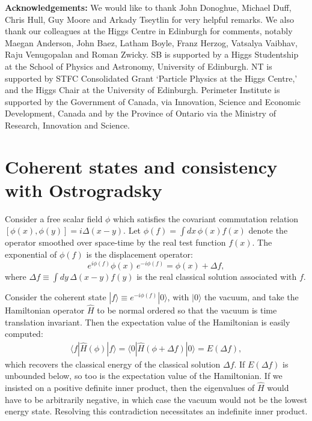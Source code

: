 \documentclass[pra,aps,amsmath,amssymb,notitlepage, twocolumn,superscriptaddress,longbibliography,nofootinbib,floatfix,10pt]{revtex4-2}
\begin{document}
{\bf Acknowledgements:} We would like to thank John Donoghue, Michael Duff, Chris Hull, Guy Moore and Arkady Tseytlin for very helpful remarks. We also thank our colleagues at the Higgs Centre in Edinburgh for comments, notably Maegan Anderson, John Baez, Latham Boyle, Franz Herzog, Vatsalya Vaibhav, Raju Venugopalan and Roman Zwicky. SB is supported by a Higgs Studentship at the School of Physics and Astronomy, University of
Edinburgh. NT is supported by STFC Consolidated Grant ‘Particle Physics at the Higgs Centre,’ and the Higgs Chair at
the University of Edinburgh. Perimeter Institute
is supported by the Government of Canada, via
Innovation, Science and Economic Development,
Canada and by the Province of Ontario via the
Ministry of Research, Innovation and Science.


%

\appendix

\section{Coherent states and consistency with Ostrogradsky}
\label{app:coherent}

Consider a free scalar field $\phi$ which satisfies the covariant commutation relation $[\phi(x),\phi(y)]=i\Delta(x-y)$. Let $\phi(f)=\int d x\,\phi(x) f(x)$ denote the operator smoothed over space-time by the real test function $f(x)$. The exponential of $\phi(f)$ is the displacement operator:
\begin{equation}
    e^{i\phi(f)}\phi(x) \, e^{-i\phi(f)}=\phi(x)+\Delta f,
\end{equation}
where $\Delta f \equiv \int dy\,\Delta(x-y)f(y)$ is the real classical solution associated with $f$. 
 
 Consider the coherent state $|f\rangle \equiv e^{-i\phi(f)}|0\rangle$, with $|0\rangle$ the vacuum, and take the Hamiltonian operator $\hat{H}$ to be normal ordered so that the vacuum is time translation invariant. Then the expectation value of the Hamiltonian is easily computed:
\begin{eqnarray}
\langle f|\hat{H}(\phi) |f\rangle 
  =\langle 0 | \hat{H}(\phi+\Delta f) |0\rangle  = E(\Delta f),
\end{eqnarray}
which recovers the classical energy of the classical solution $\Delta f$. If $E(\Delta f)$ is unbounded below, so too is the expectation value of the Hamiltonian. If we insisted on a positive definite inner product, then the eigenvalues of $\hat{H}$ would have to be arbitrarily negative, in which case the vacuum would not be the lowest energy state. Resolving this contradiction necessitates an indefinite inner product.
\end{document}
